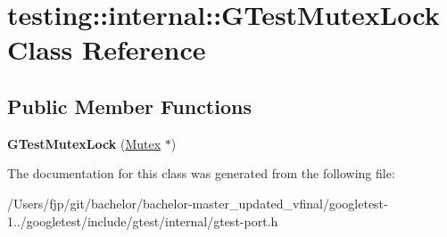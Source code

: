 \hypertarget{classtesting_1_1internal_1_1_g_test_mutex_lock}{}\section{testing\+:\+:internal\+:\+:G\+Test\+Mutex\+Lock Class Reference}
\label{classtesting_1_1internal_1_1_g_test_mutex_lock}
\subsection*{Public Member Functions}
\begin{DoxyCompactItemize}
\item 
\mbox{\label{classtesting_1_1internal_1_1_g_test_mutex_lock_a77e3cba326d5356b4a1dea3790559c26}} 
{\bfseries G\+Test\+Mutex\+Lock} (\mbox{\hyperlink{classtesting_1_1internal_1_1_mutex}{Mutex}} $\ast$)
\end{DoxyCompactItemize}


The documentation for this class was generated from the following file\+:\begin{DoxyCompactItemize}
\item 
/\+Users/fjp/git/bachelor/bachelor-\/master\+\_\+updated\+\_\+vfinal/googletest-\/1../googletest/include/gtest/internal/gtest-\/port.\+h\end{DoxyCompactItemize}
